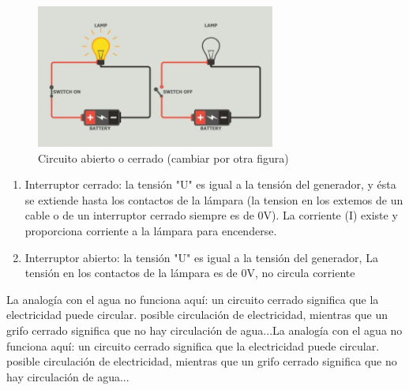 \documentclass[a5paper,twoside,openany]{book}
\begin{document}
\begin{figure}[h]
\includegraphics[width=0.7\textwidth]{circuito-abierto-cerrado} %
\centering
\caption*{Circuito abierto o cerrado (cambiar por otra figura)}
\end{figure}

\begin{enumerate}
\item Interruptor cerrado: la tensión "U" es igual a la tensión del generador, y ésta se extiende hasta los contactos de la lámpara (la tension en los extemos de un cable o de un interruptor cerrado siempre es de 0V). La corriente (I) existe y proporciona corriente a la lámpara para encenderse.
\item Interruptor abierto: la tensión "U" es igual a la tensión del generador, La tensión en los contactos de la lámpara es de 0V, no circula corriente
\end{enumerate}
La analogía con el agua no funciona aquí: un circuito cerrado significa que la electricidad puede circular.
posible circulación de electricidad, mientras que un grifo cerrado significa que no hay
circulación de agua...La analogía con el agua no funciona aquí: un circuito cerrado significa que la electricidad puede circular.
posible circulación de electricidad, mientras que un grifo cerrado significa que no hay
circulación de agua...

\end{document}
